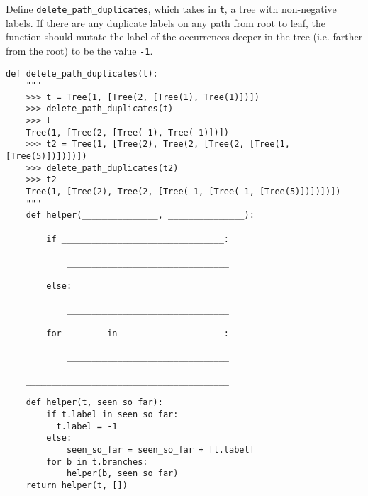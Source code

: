 
\question
Define \texttt{delete\_path\_duplicates}, which takes in \texttt{t}, a tree
with non-negative labels. If there are any duplicate labels on any path
from root to leaf, the function should mutate the label of the occurrences
deeper in the tree (i.e. farther from the root) to be the value \texttt{-1}.

\begin{lstlisting}
def delete_path_duplicates(t):
    """
    >>> t = Tree(1, [Tree(2, [Tree(1), Tree(1)])])
    >>> delete_path_duplicates(t)
    >>> t
    Tree(1, [Tree(2, [Tree(-1), Tree(-1)])])
    >>> t2 = Tree(1, [Tree(2), Tree(2, [Tree(2, [Tree(1, [Tree(5)])])])])
    >>> delete_path_duplicates(t2)
    >>> t2
    Tree(1, [Tree(2), Tree(2, [Tree(-1, [Tree(-1, [Tree(5)])])])])
    """
    def helper(_______________, _______________):

        if ________________________________:

            ________________________________

        else:

            ________________________________

        for _______ in ____________________:

            ________________________________

    ________________________________________

\end{lstlisting}

\begin{blocksection}
\begin{solution}
\begin{lstlisting}
    def helper(t, seen_so_far):
        if t.label in seen_so_far:
          t.label = -1
        else:
            seen_so_far = seen_so_far + [t.label]
        for b in t.branches:
            helper(b, seen_so_far)
    return helper(t, [])
\end{lstlisting}
\end{solution}
\end{blocksection}

